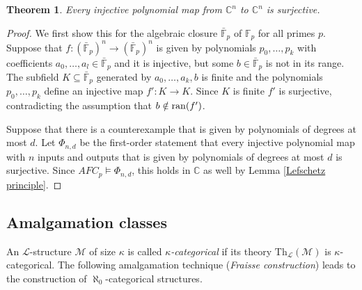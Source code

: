\documentclass[10pt]{amsart}
\renewcommand{\L}{\mathcal{L}}
\newcommand{\FF}{\mathbb{F}}
\newcommand{\ran}[1]{{{\rm{ran}}(#1)}}
\newcommand{\CCC}{\mathbb{C}}
\newcommand{\MM}{\mathcal{M}}
\newcommand{\Th}{\mathrm{Th}}
\newtheorem{theorem}{Theorem}[subsection]
\newtheorem{problem}[theorem]{Problem}
\theoremstyle{definition}
\theoremstyle{remark}
\begin{document}
\begin{theorem} 
Every injective polynomial map from $\CCC^n$ to $\CCC^n$ is surjective.
\end{theorem} 
\begin{proof} 
We first show this for the algebraic closure $\bar{\FF}_p$ of $\FF_p$ for all primes $p$. Suppose that $f\colon (\bar{\FF}_p)^n\rightarrow (\bar{\FF}_p)^n$ is given by polynomials $p_0,\dots,p_k$ 
with coefficients $a_0,\dots,a_l\in \bar{\FF}_p$ and it is injective, but some $b\in \bar{\FF}_p$ is not in its range. The subfield $K\subseteq \bar{\FF}_p$ generated by $a_0,\dots,a_k,b$ is finite and the polynomials $p_0,\dots,p_k$ define an injective map $f'\colon K\rightarrow K$. Since $K$ is finite $f'$ is surjective, contradicting the assumption that $b\notin \ran{f'}$. 

Suppose that there is a counterexample that is given by polynomials of degrees at most $d$. Let $\Phi_{n,d}$ be the first-order statement that every injective polynomial map with $n$ inputs and outputs that is given by polynomials of degrees at most $d$ is surjective. Since $AFC_p\models \Phi_{n,d}$, this holds in $\CCC$ as well by Lemma \ref{Lefschetz principle}. 
\end{proof} 






\subsection{Amalgamation classes} 

An $\L$-structure $\MM$ of size $\kappa$ is called \emph{$\kappa$-categorical} if its theory $\Th_\L(\MM)$ is $\kappa$-categorical. The following amalgamation technique (\emph{Fraisse construction}) leads to the construction of $\aleph_0$-categorical structures. 
\end{document}
